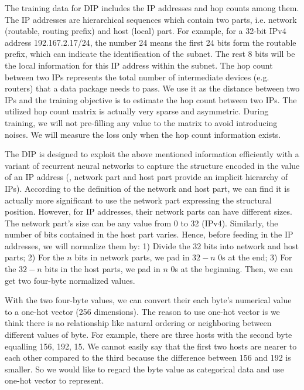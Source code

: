 The training data for DIP includes the IP addresses and hop counts among them. The IP addresses are hierarchical sequences which contain two parts, i.e. network (routable, routing prefix) and host (local) part. For example, for a 32-bit IPv4 address 192.167.2.17/24, the number 24 means the first 24 bits form the routable prefix, which can indicate the identification of the subnet. The rest 8 bits will be the local information for this IP address within the subnet. The hop count between two IPs represents the total number of intermediate devices (e.g. routers) that a data package needs to pass. We use it as the distance between two IPs and the training objective is to estimate the hop count between two IPs. The utilized hop count matrix is actually very sparse and asymmetric. During training, we will not pre-filling any value to the matrix to avoid introducing noises. We will  measure the loss only when the hop count information exists. 

The DIP is designed to exploit the above mentioned information efficiently with a variant of recurrent neural networks to capture the structure encoded in the value of an IP address (\ie{}, network part and host part provide an implicit hierarchy of IPs). According to the definition of the network and host part, we can find it is actually more significant to use the network part expressing the structural position. However, for IP addresses, their network parts can have different sizes. The network part's size can be any value from 0 to 32 (IPv4).  Similarly, the number of bits contained in the host part varies. Hence, before feeding in the IP addresses, we will normalize them by: 1) Divide the 32 bits into network and host parts; 2) For the $n$ bits in network parts, we pad in $32-n$ 0s at the end; 3) For the $32-n$ bits in the host parts, we pad in $n$ 0s at the beginning. Then, we can get two four-byte normalized values.  

With the two four-byte values, we can convert their each byte's numerical value to a one-hot vector (256 dimensions). The reason to use one-hot vector is we think there is no relationship like natural ordering or neighboring between different values of byte. For example, there are three hosts with the second byte equalling 156, 192, 15. We cannot easily say that the first two hosts are nearer to each other compared to the third because the difference between 156 and 192 is smaller. So we would like to regard the byte value as categorical data and use one-hot vector to represent. 

